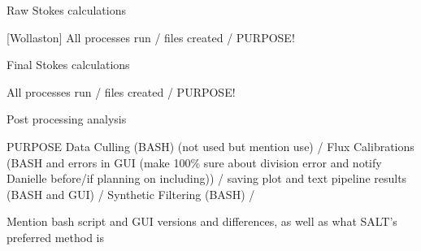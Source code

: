 \noindent Raw Stokes calculations

[Wollaston]
All processes run / files created / PURPOSE!

\noindent Final Stokes calculations

All processes run / files created / PURPOSE!

\noindent Post processing analysis %

PURPOSE
Data Culling (BASH) (not used but mention use) / 
Flux Calibrations (BASH and errors in GUI (make 100\% sure about division error and notify Danielle before/if planning on including)) / 
saving plot and text pipeline results (BASH and GUI) / 
Synthetic Filtering (BASH) / 

Mention bash script and GUI versions and differences, as well as what SALT's preferred method is
